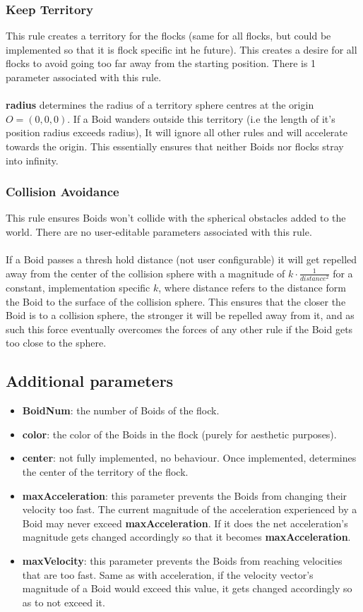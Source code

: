 \documentclass[12pt]{article}
\begin{document}
\subsubsection{Keep Territory}
This rule creates a territory for the flocks (same for all flocks, but could be implemented so that it is flock specific int he future). This creates a desire for all flocks to avoid going too far away from the starting position. There is 1 parameter associated with this rule.
\\ \\
\textbf{radius} determines the radius of a territory sphere centres at the origin $O=(0,0,0)$. If a Boid wanders outside this territory (i.e the length of it's position radius exceeds radius), It will ignore all other rules and will accelerate towards the origin. This essentially ensures that neither Boids nor flocks stray into infinity.

\subsubsection{Collision Avoidance}
This rule ensures Boids won't collide with the spherical obstacles added to the world. There are no user-editable parameters associated with this  rule.
\\ \\
If a Boid passes a thresh hold distance (not user configurable) it will get repelled away from the center of the collision sphere with a magnitude of $k\cdot \frac{1}{distance^2}$ for a constant, implementation specific $k$, where distance refers to the distance form the Boid to the surface of the collision sphere. This ensures that the closer the Boid is to a collision sphere, the stronger it will be repelled away from it, and as such this force eventually overcomes the forces of any other rule if the Boid gets too close to the sphere.

\subsection{Additional parameters}
\begin{itemize}
	\item \textbf{BoidNum}: the number of Boids of the flock.
	\item \textbf{color}: the color of the Boids in the flock (purely for aesthetic purposes).
	\item \textbf{center}: not fully implemented, no behaviour. Once implemented, determines the center of the territory of the flock.
	\item \textbf{maxAcceleration}: this parameter prevents the Boids from changing their velocity too fast. The current magnitude of the acceleration experienced by a Boid may never exceed \textbf{maxAcceleration}. If it does the net acceleration's magnitude gets changed accordingly so that it becomes \textbf{maxAcceleration}.
	\item \textbf{maxVelocity}: this parameter prevents the Boids from reaching velocities that are too fast. Same as with acceleration, if the velocity vector's magnitude of a Boid would exceed this value, it gets changed accordingly so as to not exceed it. 
\end{itemize}
\end{document}
